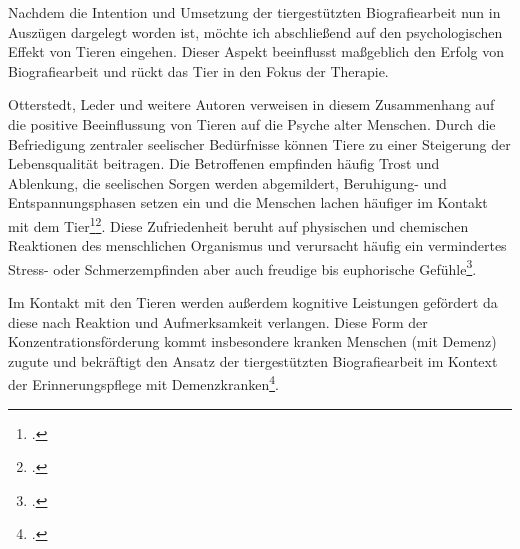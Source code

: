 Nachdem die Intention und Umsetzung der tiergestützten Biografiearbeit nun in Auszügen dargelegt worden ist, möchte ich abschließend auf den psychologischen Effekt von Tieren eingehen. Dieser Aspekt beeinflusst maßgeblich den Erfolg von Biografiearbeit und rückt das Tier in den Fokus der Therapie.

Otterstedt, Leder und weitere Autoren verweisen in diesem Zusammenhang auf die positive Beeinflussung von Tieren auf die Psyche alter Menschen. Durch die Befriedigung zentraler seelischer Bedürfnisse können Tiere zu einer Steigerung der Lebensqualität beitragen. Die Betroffenen empfinden häufig Trost und Ablenkung, die seelischen Sorgen werden abgemildert, Beruhigung- und Entspannungsphasen setzen ein und die Menschen lachen häufiger im Kontakt mit dem Tier\footcite[27f]{Otterstedt2001}\footcite[75]{Leder2006}. Diese Zufriedenheit beruht auf physischen und chemischen Reaktionen des menschlichen Organismus und verursacht häufig ein vermindertes Stress- oder Schmerzempfinden aber auch  freudige bis euphorische Gefühle\footcite[75]{Leder2006}. 

Im Kontakt mit den Tieren werden außerdem kognitive Leistungen gefördert da diese nach Reaktion und Aufmerksamkeit verlangen. Diese Form der Konzentrationsförderung kommt insbesondere kranken Menschen (mit Demenz) zugute und bekräftigt den Ansatz der tiergestützten Biografiearbeit im Kontext der Erinnerungspflege mit Demenzkranken\footcite[76]{Leder2006}.
